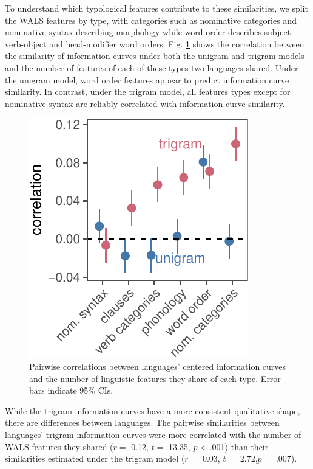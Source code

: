 \documentclass[man,floatsintext]{apa6}
\begin{document}
To understand which typological features contribute to these similarities, we split the WALS features by type, with categories such as nominative categories and nominative syntax describing morphology while word order describes subject-verb-object and head-modifier word orders. Fig. \ref{fig:type-cors} shows the correlation between the similarity of information curves under both the unigram and trigram models and the number of features of each of these types two-languages shared. Under the unigram model, word order features appear to predict information curve similarity. In contrast, under the trigram model, all features types except for nominative syntax are reliably correlated with information curve similarity.

\begin{figure}[tb]

{\centering \includegraphics{figs/type-cors-1} 

}

\caption{Pairwise correlations between languages' centered information curves and the number of linguistic features they share of each type. Error bars indicate 95\% CIs.}\label{fig:type-cors}
\end{figure}

While the trigram information curves have a more consistent qualitative shape, there are differences between languages. The pairwise similarities between languages' trigram information curves were more correlated with the number of WALS features they shared (\(r =\) 0.12, \(t =\) 13.35, \(p\) \textless{} .001) than their similarities estimated under the trigram model (\(r =\) 0.03, \(t =\) 2.72,\(p =\) .007).
\end{document}
